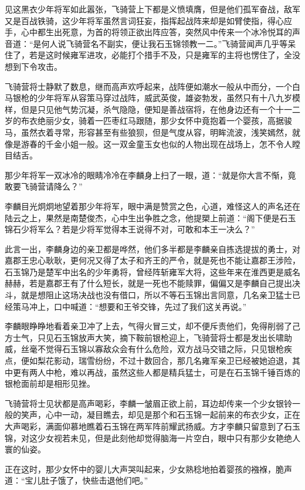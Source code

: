 见这黑衣少年将军如此嚣张，飞骑营上下都是义愤填膺，但是他们孤军奋战，敌军又是百战铁骑，这少年将军虽然言词狂妄，指挥起战阵来却是如臂使指，得心应手，心中都生出死意，为首的将领正欲出阵应答，突然风中传来一个冰冷悦耳的声音道：“是何人说飞骑营名不副实，便让我石玉锦领教一二。”飞骑营闻声几乎等呆住了，若是这时候雍军进攻，必能打个措手不及，只是雍军的主将也愣住了，全没想到下令攻击。

飞骑营将士静默了数息，继而高声欢呼起来，战阵便如潮水一般从中而分，一个白马银枪的少年将军从容策马穿过战阵，威武英俊，雄姿勃发，虽然只有十八九岁模样，但是只见他气势沉凝，杀气隐隐，便知是善战宿将，在他身边还有一个十一二岁的布衣绝丽少女，骑着一匹枣红马跟随，那少女怀中竟抱着一个婴孩，高据骏马，虽然衣着寻常，形容甚至有些狼狈，但是气度从容，明眸流波，浅笑嫣然，就像是游春的千金小姐一般。这一双金童玉女也似的人物出现在战场上，怎不令人瞠目结舌。

那少年将军一双冰冷的眼睛冷冷在李麟身上扫了一眼，道：“就是你大言不惭，竟敢要飞骑营请降么？”

李麟目光炯炯地望着那少年将军，眼中满是赞赏之色，心道，难怪这人的声名还在陆云之上，果然是南楚俊杰，心中生出争胜之念，他提槊上前道：“阁下便是石玉锦石少将军么？若是少将军觉得本王说得不对，可敢和本王一决么？”

此言一出，李麟身边的亲卫都是哗然，他们多半都是李麟亲自拣选提拔的勇士，对嘉郡王忠心耿耿，更何况又得了太子和齐王的严令，就是死也不能让嘉郡王涉险，石玉锦乃是楚军中出名的少年勇将，曾经阵斩雍军大将，这些年来在淮西更是威名赫赫，若是嘉郡王有了什么短长，就是一死也不能赎罪，偏偏又是李麟自己提出决斗，就是想阻止这场决战也没有借口，所以不等石玉锦出言同意，几名亲卫猛士已经策马冲上，口中喊道：“想要和王爷交锋，先过了我们这关再说。”

李麟眼睁睁地看着亲卫冲了上去，气得火冒三丈，却不便斥责他们，免得削弱了己方士气，只见石玉锦放声大笑，摘下鞍前银枪迎上，飞骑营将士都是发出长啸助威，丝毫不觉得石玉锦以寡敌众会有什么危险，双方战马交错之际，只见银枪疾点，便如梨花影动，瑞雪纷纷，不过十数回合，那几名雍军亲卫已经被她迫退，其中更有两人中枪，难以再战，虽然这些人都是精兵猛士，可是在石玉锦千锤百炼的银枪面前却是相形见挫。

飞骑营将士见状都是高声喝彩，李麟一皱眉正欲上前，耳边却传来一个少女银铃一般的笑声，心中一动，凝目瞧去，却见是那个和石玉锦一起前来的布衣少女，正在大声喝彩，满面仰慕地瞧着石玉锦在两军阵前耀武扬威。方才李麟只留意到了石玉锦，对这少女视若未见，但是此刻他却觉得脑海一片空白，眼中只有那少女艳绝人寰的仙姿。

正在这时，那少女怀中的婴儿大声哭叫起来，少女熟稔地拍着婴孩的襁褓，脆声道：“宝儿肚子饿了，快些击退他们吧。”

